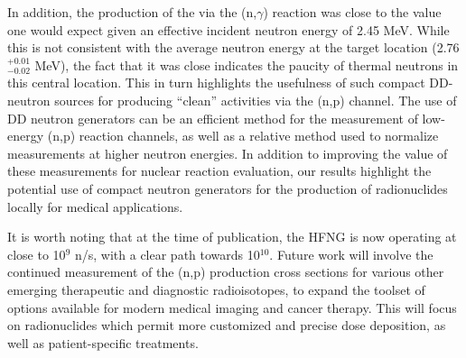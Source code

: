  In addition, the   production of the   via the (n,$\gamma$) reaction was close to the value one would expect given an effective incident neutron energy of 2.45 MeV.  
 While this is not consistent with the average neutron energy at the target location (2.76$^{+0.01}_{-0.02}$ MeV), the fact that it was close indicates the paucity of thermal neutrons in this central location.  
 This in turn highlights the usefulness of such compact DD-neutron sources  for producing \enquote{clean} activities via the (n,p) channel.  
The use of DD neutron generators can be an efficient method for the measurement of low-energy (n,p) reaction channels, as well as a relative method used to normalize measurements at higher neutron energies.
 In addition to improving the value of these measurements for nuclear reaction evaluation, our results highlight the potential use of compact neutron generators for the production of radionuclides locally for medical applications.


 It is worth noting that at the time of publication, the  HFNG is now operating at close to 10$^9$ n/s, with
a clear path towards 10$^{10}$.
 Future work will involve the continued measurement of the (n,p) production cross sections for various other emerging therapeutic and diagnostic radioisotopes, to expand the toolset of options available for modern medical imaging and cancer therapy.
This will focus on radionuclides which permit more customized and precise dose deposition, as well as patient-specific treatments.